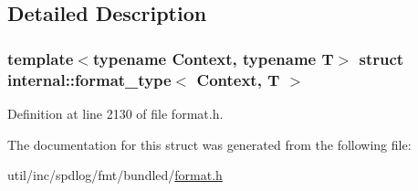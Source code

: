\subsection{Detailed Description}
\subsubsection*{template$<$typename Context, typename T$>$\newline
struct internal\+::format\+\_\+type$<$ Context, T $>$}



Definition at line 2130 of file format.\+h.



The documentation for this struct was generated from the following file\+:\begin{DoxyCompactItemize}
\item 
util/inc/spdlog/fmt/bundled/\hyperlink{format_8h}{format.\+h}\end{DoxyCompactItemize}
